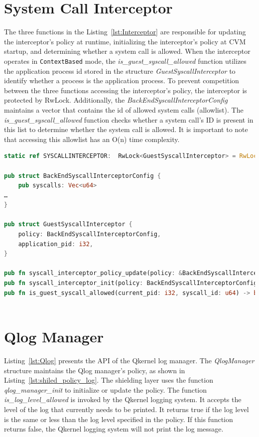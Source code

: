 \section{System Call Interceptor}
\label{sec:impl_interceptor}
The three functions in the Listing~\ref{lst:Interceptor} are responsible for updating the interceptor’s policy at runtime, initializing the interceptor’s policy at \acrshort{CVM} startup, and determining whether a system call is allowed. When the interceptor operates in \texttt{ContextBased} mode, 
the \emph{is\_guest\_syscall\_allowed} function utilizes the application process id stored in the structure \emph{GuestSyscallInterceptor} to identify whether a process is the application process. To prevent competition between the three functions accessing the interceptor's policy, the interceptor is 
protected by RwLock. Additionally, the \emph{BackEndSyscallInterceptorConfig} maintains a vector that contains the id of allowed system calls (allowlist). The \emph{is\_guest\_syscall\_allowed} function checks whether a system call's ID is present in this list to determine whether the system call 
is allowed. It is important to note that accessing this allowlist has an O(n) time complexity.

\begin{lstlisting}[language=rust, caption= API of system call interceptor, label={lst:Interceptor}]
static ref SYSCALLINTERCEPTOR:  RwLock<GuestSyscallInterceptor> = RwLock::new(GuestSyscallInterceptor::default());

pub struct BackEndSyscallInterceptorConfig {
    pub syscalls: Vec<u64>
…
}

pub struct GuestSyscallInterceptor {
    policy: BackEndSyscallInterceptorConfig,
    application_pid: i32,
}

pub fn syscall_interceptor_policy_update(policy: &BackEndSyscallInterceptorConfig) -> Result<()> 
pub fn syscall_interceptor_init(policy: BackEndSyscallInterceptorConfig) -> Result<()> 
pub fn is_guest_syscall_allowed(current_pid: i32, syscall_id: u64) -> bool
    
\end{lstlisting}


\section{Qlog Manager}
\label{sec:iml_qlog}
Listing~\ref{lst:Qlog} presents the API of the Qkernel log manager. The \emph{QlogManager} structure maintains the Qlog manager's policy, as shown in Listing~\ref{lst:shiled_policy_log}. The shielding layer uses the function \emph{qlog\_manager\_init} to initialize or update the policy. 
The function \emph{is\_log\_level\_allowed}  is invoked by 
the Qkernel logging system. It accepts the level of the log that currently needs to be printed. It returns true if the log level is the same or less than the log level specified in the policy. If this function returns false, the Qkernel logging system will not print the log message.

